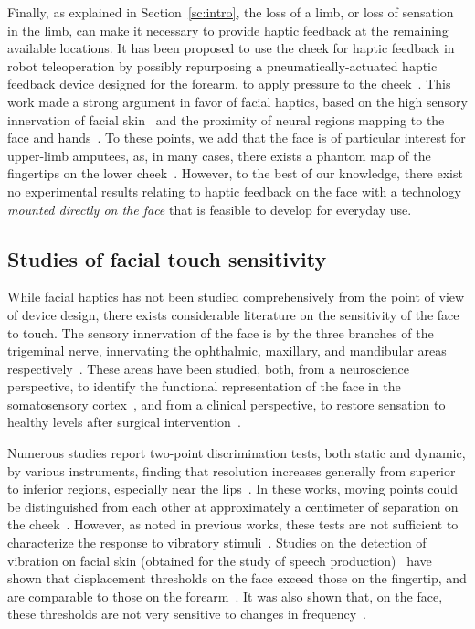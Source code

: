 Finally, as explained in Section~\ref{sc:intro}, the loss of a limb, or loss of sensation in the limb, can make it necessary to provide haptic feedback at the remaining available locations. It has been proposed to use the cheek for haptic feedback in robot teleoperation by possibly repurposing a pneumatically-actuated haptic feedback device designed for the forearm, to apply pressure to the cheek~\cite{guptasarma2024}. This work made a strong argument in favor of facial haptics, based on the high sensory innervation of facial skin~\cite{corniani2020tactile} and the proximity of neural regions mapping to the face and hands~\cite{leemhuis2022rethinking}. To these points, we add that the face is of particular interest for upper-limb amputees, as, in many cases, there exists a phantom map of the fingertips on the lower cheek~\cite{ramachandran1998ThePO}. However, to the best of our knowledge, there exist no experimental results relating to haptic feedback on the face with a technology \emph{mounted directly on the face} that is feasible to develop for everyday use. 

\subsection{Studies of facial touch sensitivity}
While facial haptics has not been studied comprehensively from the point of view of device design, there exists considerable literature on the sensitivity of the face to touch. The sensory innervation of the face is by the three branches of the trigeminal nerve, innervating the ophthalmic, maxillary, and mandibular areas respectively~\cite{gray1918}. These areas have been studied, both, from a neuroscience perspective, to identify the functional representation of the face in the somatosensory cortex~\cite{kikkert2023}, and from a clinical perspective, to restore sensation to healthy levels after surgical intervention~\cite{siemionow2011}.

Numerous studies report two-point discrimination tests, both static and dynamic, by various instruments, finding that resolution increases generally from superior to inferior regions, especially near the lips~\cite{costasNormalSensationHuman1994, fogacaEvaluationCutaneousSensibility2005, vriensExtensionNormalValues2009b}. In these works, moving points could be distinguished from each other at approximately a centimeter of separation on the cheek~\cite{fogacaEvaluationCutaneousSensibility2005}. However, as noted in previous works, these tests are not sufficient to characterize the response to vibratory stimuli~\cite{cholewiakVibrotactileLocalizationAbdomen2004b}. Studies on the detection of vibration on facial skin (obtained for the study of speech production)~\cite{barlow1987} have shown that displacement thresholds on the face exceed those on the fingertip, and are comparable to those on the forearm~\cite{morioka2008vibrotactile}. It was also shown that, on the face, these thresholds are not very sensitive to changes in frequency~\cite{barlow1987}.

